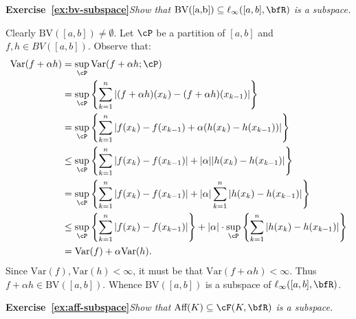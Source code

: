     \textbf{Exercise~\ref{ex:bv-subspace}}\hspace{6pt}\textit{Show that $\text{BV([a,b])} \subseteq \ell_\infty([a,b],\bfR)$ is a subspace.}
        \begin{solution}
            Clearly $\text{BV}([a,b]) \neq \emptyset$. Let $\cP$ be a partition of $[a,b]$ and $f,h \in BV([a,b])$. \newline Observe that:
                \begin{equation*}
                \begin{split}
                    \text{Var}(f + \alpha h) 
                    & = \sup_{\cP}\text{Var}(f+\alpha h ; \cP) \\
                    & = \sup_{\cP} \left\{\sum_{k = 1}^n|(f+\alpha h)(x_{k}) - (f+\alpha h)(x_{k-1})|\right\} \\
                    & = \sup_{\cP} \left\{\sum_{k = 1}^n|f(x_k) - f(x_{k-1}) + \alpha (h(x_{k}) - h(x_{k-1}))|\right\} \\
                    & \leq \sup_{\cP} \left\{\sum_{k = 1}^n|f(x_k) - f(x_{k-1})| + |\alpha||h(x_k) - h(x_{k-1})|\right\} \\
                    & = \sup_{\cP} \left\{\sum_{k=1}^n|f(x_k) - f(x_{k-1})| + |\alpha|\sum_{k = 1}^n|h(x_k) - h(x_{k-1})|\right\} \\
                    & \leq \sup_{\cP} \left\{\sum_{k=1}^n|f(x_k) - f(x_{k-1})| \right\}+ |\alpha|\cdot \sup_{\cP}\left\{\sum_{k = 1}^n|h(x_k) - h(x_{k-1})|\right\} \\
                    & = \text{Var}(f) + \alpha \text{Var}(h).
                \end{split}
                \end{equation*}
            Since $\text{Var}(f), \text{Var}(h) < \infty$, it must be that $\text{Var}(f+ \alpha h) < \infty$. Thus $f+\alpha h \in \text{BV}([a,b])$. Whence $\text{BV}([a,b])$ is a subspace of $\ell_\infty([a,b],\bfR)$.
        \end{solution}
        \vspace{8pt}

    \textbf{Exercise~\ref{ex:aff-subspace}}\hspace{6pt}\textit{Show that $\text{Aff}(K) \subseteq \cF(K,\bfR)$ is a subspace.}
        \begin{solution}
            
        \end{solution}
        \vspace{8pt}

